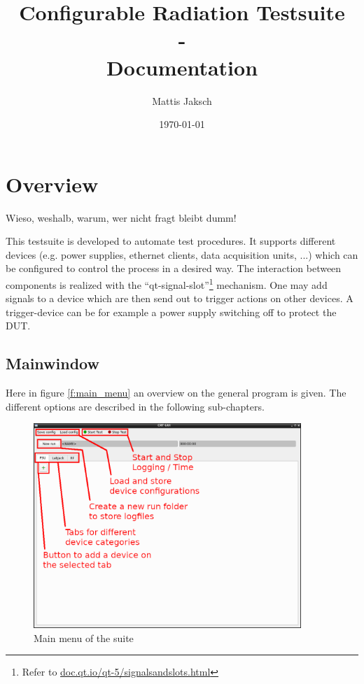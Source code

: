 \documentclass[10pt,a4paper]{article}
\title{Configurable Radiation Testsuite \\- \\Documentation}
\author{Mattis Jaksch}
\date{\today}
\begin{document}
\maketitle

\tableofcontents

\flushleft

\newpage

\section{Overview}
Wieso, weshalb, warum, wer nicht fragt bleibt dumm!

\bigbreak

This testsuite is developed to automate test procedures. It supports different devices (e.g. power supplies, ethernet clients, data acquisition units, ...) which can be configured to control the process in a desired way. The interaction between components is realized with the \enquote{qt-signal-slot}\footnote{Refer to \url{doc.qt.io/qt-5/signalsandslots.html}} mechanism. One may add signals to a device which are then send out to trigger actions on other devices. A trigger-device can be for example a power supply switching off to protect the DUT.

	\subsection{Mainwindow}
	Here in figure \eqref{f:main_menu} an overview on the general program is given. The different options are described in the following sub-chapters.
	
	\begin{figure}[H]
\centering
\includegraphics[width=0.9\textwidth]{./1_Plain_Expl.png}
\caption{Main menu of the suite}
\label{f:main_menu}
	\end{figure}
	
\end{document}
